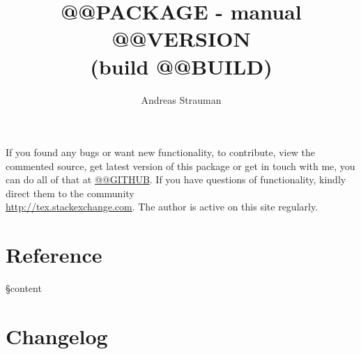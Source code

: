 \documentclass{article}
\title{{@@PACKAGE - manual\\ @@VERSION{\\[-0.5em]\footnotesize(build @@BUILD)}}}
\author{Andreas Strauman}
\let\oldsection\section
\gdef\section{\needspace{0.3\paperheight}\oldsection}
\begin{document}
\maketitle


If you found any bugs or want new functionality, to contribute, view the commented source, get latest version of this package or get in touch with me, you can do all of that at \url{@@GITHUB}. If you have questions of functionality, kindly direct them to the community\\ \url{http://tex.stackexchange.com}. The author is active on this site regularly.

\tableofcontents
\clearpage

\section{Reference}
§content
\section{Changelog}

\end{document}
